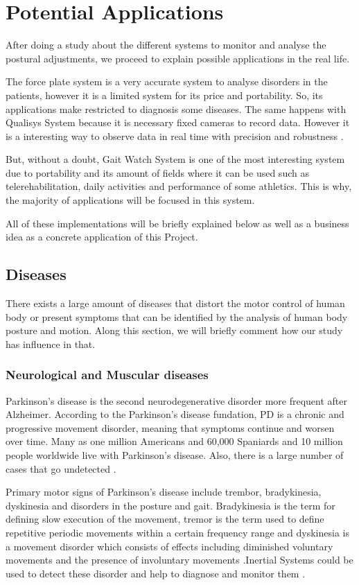 \chapter{Potential Applications}
\label{ch:Applications}

After doing a study about the different systems to monitor and analyse the postural adjustments, we proceed to explain possible applications in the real life.

The force plate system is a very accurate system to analyse disorders in the patients, however it is a limited system for its price and portability. So, its applications make restricted to diagnosis some diseases.
The same happens with Qualisys System because it is necessary fixed cameras to record data. However it is a interesting way to observe data in real time with precision and robustness .

But, without a doubt, Gait Watch System is one of the most interesting system due to portability and its amount of fields where it can be used such as telerehabilitation, daily activities and performance of some athletics. This is why, the majority of applications will be focused in this system.

All of these implementations will be briefly explained below as well as a business idea as a concrete application of this Project.

\section{Diseases}
There exists a large amount of diseases that distort the motor control of human body or present symptoms that can be identified by the analysis of human body posture and motion. Along this section,  we will briefly comment how our study has influence in that.

\subsection{Neurological and Muscular diseases}
Parkinson’s disease is the second neurodegenerative disorder more frequent after Alzheimer\cite{AppPD}. According to the Parkinson’s disease fundation, PD is a chronic and progressive movement disorder, meaning that symptoms continue and worsen over time\cite{pdf}.
Many as one million Americans and 60,000 Spaniards and 10 million people worldwide live with Parkinson’s disease. Also, there is a large number of cases that go undetected \cite{A.Olivares2013}.

Primary motor signs of Parkinson’s disease include trembor, bradykinesia, dyskinesia and disorders in the posture and gait. Bradykinesia is the term for defining slow execution of the movement, tremor is the term used to define repetitive periodic movements within a certain frequency range and dyskinesia is a movement disorder which consists of effects including diminished voluntary movements and the presence of involuntary movements .Inertial Systems could be used to detect these disorder and help to diagnose and monitor them \cite{A.Olivares2013}.

